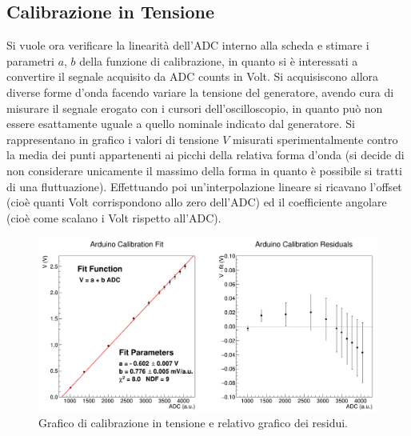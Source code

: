 \documentclass[a4paper,11pt]{article} %
\begin{document}

\subsection{Calibrazione in Tensione}
Si vuole ora verificare la linearità dell'ADC interno alla scheda e stimare i parametri $a$, $b$ della funzione di
calibrazione, in quanto si è interessati a convertire il segnale acquisito da ADC counts in Volt. Si acquisiscono allora
diverse forme d'onda facendo variare la tensione del generatore, avendo cura di misurare il segnale erogato con i
cursori dell'oscilloscopio, in quanto può non essere esattamente uguale a quello nominale indicato dal generatore. Si
rappresentano in grafico i valori di tensione $V$ misurati sperimentalmente contro la media dei punti appartenenti ai
picchi della relativa forma d'onda (si decide di non considerare unicamente il massimo della forma in quanto è possibile
si tratti di una fluttuazione). Effettuando poi un'interpolazione lineare si ricavano l'offset (cioè
quanti Volt corrispondono allo zero dell'ADC) ed il coefficiente angolare (cioè come scalano i Volt rispetto all'ADC).

\begin{figure}[H]
	\centering
	\includegraphics[width=15cm]{../Arduino/Plots/calib_function.png}
	\caption{Grafico di calibrazione in tensione e relativo grafico dei residui.}
	\label{i:ar_calib}
\end{figure}
\end{document}
